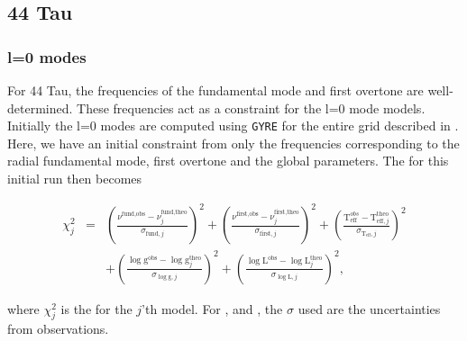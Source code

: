 
\subsection{44 Tau}
\label{sec:chi44}

\subsubsection{l=0 modes}

For 44 Tau, the frequencies of the fundamental mode and first overtone are well-determined. These frequencies act as a constraint for the l=0 mode models. Initially the l=0 modes are computed using \texttt{GYRE} for the entire grid described in . Here, we have an initial constraint from only the frequencies corresponding to the radial fundamental mode, first overtone and the global parameters. The \chis for this initial run then becomes

\begin{align}
\chi^2_j & = & \left(\frac{\nu^{\text{fund,obs}}-\nu_j^{\text{fund,theo}}}{\sigma_{\text{fund},j}}\right)^2 
 + \left(\frac{\nu^{\text{first,obs}}-\nu_j^{\text{first,theo}}}{\sigma_{\text{first},j}}\right)^2 
 +
\left(\frac{\text{T}_\text{eff}^{obs}-\text{T}_{\text{eff},j}^{\text{theo}}}{\sigma_{\text{T}_\text{eff},j}}\right)^2 \\
& & +
\left(\frac{\log \text{g}^\text{obs}-\log \text{g}^\text{theo}_j}{\sigma_{\log \text{g},j}}\right)^2 
 + \left(\frac{\log \text{L}^{\text{obs}}-\log \text{L}^\text{theo}_j}{\sigma_{\log \text{L},j}}\right)^2, 
 \label{eq:chis}
\end{align}

\noindent where $\chi^2_j$ is the \chis for the $j$'th model. For \teff, \logg and \lum, the $\sigma$ used are the uncertainties from observations. %

